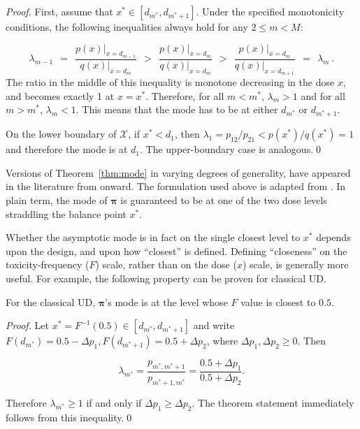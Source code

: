 \begin{proof} First, assume that $x^*\in\left[d_{m^*},d_{m^*+1}\right]$. Under the specified monotonicity conditions, the following inequalities always hold for any $2\leq m<M$:

\begin{equation}\label{eq:gammas1}
\lambda_{m-1}\ \ =\ \ \frac{p(x)\big |_{x=d_{m-1}}}{q(x)\big |_{x=d_m}}\ \ >\ \ \frac{p(x)\big |_{x=d_m}}{q(x)\big |_{x=d_{m}}}\ \ >\ \ \frac{p(x)\big |_{x=d_m}}{q(x)\big |_{x=d_{m+1}}}\ \ =\ \ \lambda_m\ .
\end{equation}
\noindent The ratio in the middle of this inequality is monotone decreasing in the dose $x$, and becomes exactly 1 at $x=x^*$. Therefore, for all $m<m^*$, $\lambda_m>1$ and for all $m>m^*$, $\lambda_m<1$. This means that the mode has to be at either $d_{m^*}$ or $d_{m^*+1}$.

\noindent On the lower boundary of $\mathcal{X}$, if $x^*<d_1$, then $\lambda_1=p_{12}/p_{21}<p\left(x^*\right)/q\left(x^*\right)=1$ and therefore the mode is at $d_1$. The upper-boundary case is analogous.\qed\end{proof}

Versions of Theorem~\ref{thm:mode} in varying degrees of generality, have appeared in the literature from \cite{Derm:Nonp:1957} onward. The formulation used above is adapted from \cite{Oron:Hoff:thek:2009}. In plain term, the mode of $\boldsymbol{\pi}$ is guaranteed to be at one of the two dose levels straddling the balance point $x^*$. 

Whether the asymptotic mode is in fact on the single closest level to $x^*$ depends upon the design, and upon how ``closest'' is defined. Defining ``closeness'' on the toxicity-frequency ($F$) scale, rather than on the dose ($x$) scale, is generally more useful. For example, the following property can be proven for classical UD.

\begin{thm}\label{thm:modesud}
For the classical UD, $\boldsymbol{\pi}$'s mode is at the level whose $F$ value is closest to $0.5$.
\end{thm}

\begin{proof} Let $x^*=F^{-1}(0.5)\in [d_{m^*},d_{m^*+1}]$ and write $F\left(d_{m^*}\right)=0.5-\Delta p_1,F\left(d_{m^*+1}\right)=0.5+\Delta p_2$, where $\Delta p_1,\Delta p_2\geq 0$. Then

\begin{equation}\label{eq:sudmode}
\lambda_{m^*}=\frac{p_{m^*,m^*+1}}{p_{m^*+1,m^*}}=\frac{0.5+\Delta p_1}{0.5+\Delta p_2}.
\end{equation}

\noindent Therefore $\lambda_{m^*}\geq 1$ if and only if $\Delta p_1\geq\Delta p_2$. The theorem statement immediately follows from this inequality.\qed
\end{proof}

